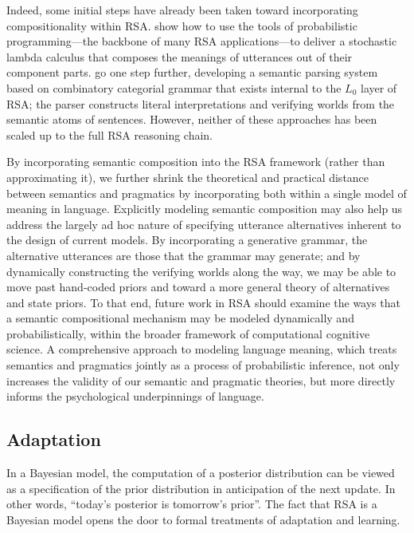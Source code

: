 \documentclass{sp}
\newcommand{\gcs}[1]{\textcolor{blue}{[gcs: #1]}}
\begin{document}
Indeed, some initial steps have already been taken toward incorporating compositionality within RSA. \cite{goodmanlassiter2015handbook} show how to use the tools of probabilistic programming---the backbone of many RSA applications---to deliver a stochastic lambda calculus that composes the meanings of utterances out of their component parts. \cite{goodmanstuhlmuller2014} go one step further, developing a semantic parsing system based on combinatory categorial grammar that exists internal to the $L_0$ layer of RSA; the parser constructs literal interpretations and verifying worlds from the semantic atoms of sentences. However, neither of these approaches has been scaled up to the full RSA reasoning chain.

By incorporating semantic composition into the RSA framework (rather than approximating it), we further shrink the theoretical and practical distance between semantics and pragmatics by incorporating both within a single model of meaning in language.
Explicitly modeling semantic composition may also help us address the largely ad hoc nature of specifying utterance alternatives inherent to the design of current models. By incorporating a generative grammar, the alternative utterances are those that the grammar may generate; and by dynamically constructing the verifying worlds along the way, we may be able to move past hand-coded priors and toward a more general theory of alternatives and state priors. 
To that end, future work in RSA should examine the ways that a semantic compositional mechanism may be modeled dynamically and probabilistically, within the broader framework of computational cognitive science. A comprehensive approach to modeling language meaning, which treats semantics and pragmatics jointly as a process of probabilistic inference, not only increases the validity of our semantic and pragmatic theories, but more directly informs the psychological underpinnings of language.



\subsection{Adaptation}

In a Bayesian model, the computation of a posterior distribution can be viewed as a specification of the prior distribution in anticipation of the next update.
In other words, ``today's posterior is tomorrow's prior''.
The fact that RSA is a Bayesian model opens the door to formal treatments of adaptation and learning. 
\end{document}

